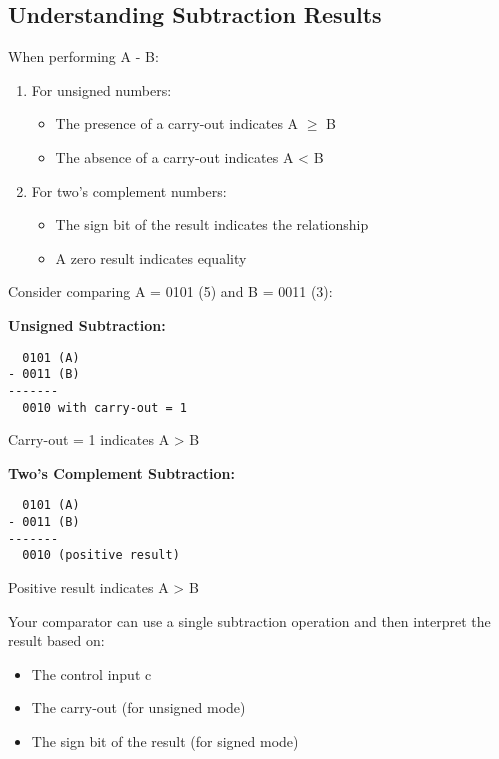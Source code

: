 \documentclass[12pt]{betterjournal}
\begin{document}
\subsection{Understanding Subtraction Results}

When performing A - B:
\begin{enumerate}
    \item For unsigned numbers:
    \begin{itemize}
        \item The presence of a carry-out indicates A $\geq$ B
        \item The absence of a carry-out indicates A < B
    \end{itemize}
    \item For two's complement numbers:
    \begin{itemize}
        \item The sign bit of the result indicates the relationship
        \item A zero result indicates equality
    \end{itemize}
\end{enumerate}

\begin{extra}[frametitle={Implementation Example}]
Consider comparing A = 0101 (5) and B = 0011 (3):

\textbf{Unsigned Subtraction:}
\begin{verbatim}
  0101 (A)
- 0011 (B)
-------
  0010 with carry-out = 1
\end{verbatim}
Carry-out = 1 indicates A > B

\textbf{Two's Complement Subtraction:}
\begin{verbatim}
  0101 (A)
- 0011 (B)
-------
  0010 (positive result)
\end{verbatim}
Positive result indicates A > B
\end{extra}

\begin{important}[frametitle={Design Consideration}]
Your comparator can use a single subtraction operation and then interpret the result based on:
\begin{itemize}
    \item The control input c
    \item The carry-out (for unsigned mode)
    \item The sign bit of the result (for signed mode)
\end{itemize}
\end{important}
\end{document}
